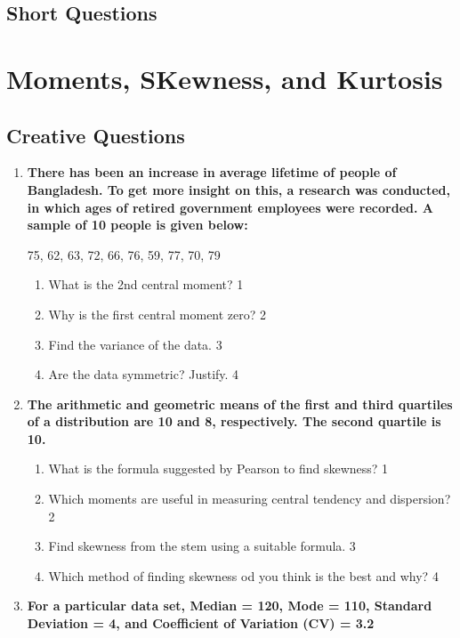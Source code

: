 \documentclass[a4paper,oneside]{book}
\begin{document}
\section{Short Questions}

\chapter{Moments, SKewness, and Kurtosis} 
\section{Creative Questions}

  \begin{enumerate}

   \item
	  \textbf{There has been an increase in average lifetime of people of Bangladesh. To get more insight on this, a research was conducted, in which ages of retired government employees were recorded. A sample of 10 people is given below:}
	  
	  \begin{center}
	  75, 62, 63, 72, 66, 76, 59, 77, 70, 79
	  \end{center}
    \begin{enumerate}
    \item
	What is the 2nd central moment? \hfill 1
    \item
	Why is the first central moment zero? \hfill 2
    \item  
	Find the variance of the data. \hfill 3
    \item
	Are the data symmetric? Justify. \hfill 4
  \end{enumerate}
  
   \item
	  \textbf{The arithmetic and geometric means of the first and third quartiles of a distribution are 10 and 8, respectively. The second quartile is 10.} 
  
  \begin{enumerate}
    \item
	What is the formula suggested by Pearson to find skewness? \hfill 1
    \item
	Which moments are useful in measuring central tendency and dispersion?  \hfill 2
    \item  
	Find skewness from the stem using a suitable formula. \hfill 3
    \item
	Which method of finding skewness od you think is the best and why? \hfill 4
\end{enumerate}
 \item
	  \textbf{For a particular data set, Median = 120, Mode = 110, Standard Deviation = 4, and Coefficient of Variation (CV)  = 3.2} 
  

\end{enumerate}
\end{document}
